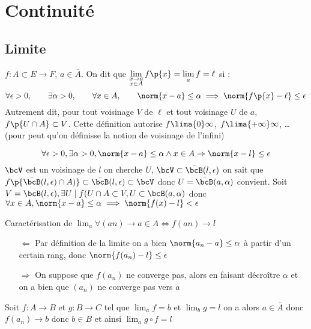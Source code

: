 \documentclass[a4paper,french,bookmarks]{book}
\begin{document}
    \section{Continuité}
    
    \subsection{Limite}
    
    $f : A \subset E \to F$, $a \in \overline{A}$. On dit que $\lim\limits_{\substack{x \to a\\ x \in A}} f\p{x} = \lim\limits_a f = \ell$ si :
    \[ \forall \epsilon > 0,\qquad \exists \alpha > 0,\qquad \forall x \in A,\qquad \norm{x - a} \leq \alpha \implies \norm{f\p{x} - \ell} \leq \epsilon\]
    Autrement dit, pour tout voisinage $V$ de $\ell$ et tout voisinage $U$ de $a$, $f\p{U \cap A} \subset V$.
    Cette définition autorise $f \lima{0} \infty$, $f \lima{+\infty} \infty$, \dots (pour peut qu'on définisse la notion de voisinage de l'infini)
    
    \[\forall \epsilon > 0, \exists \alpha > 0, \norm{x-a} \leq \alpha \land x \in A \Rightarrow \norm{x-l} \leq \epsilon\]
    \(\bcV\) est un voisinage de $l$ on cherche $U$, \(\bcV \subset \bar{\bcB}(l,\epsilon)\) on sait que \(f\p{\bar{\bcB}(l,\epsilon)\cap A)} \subset \bar{\bcB}(l,\epsilon) \subset \bcV\) donc \(U = \bar{\bcB}(a,\alpha)\) convient.
    Soit $V= \bcB(l,\epsilon), \exists U \mid f(U \cap A \subset V, U \subset \bcB(a,\alpha)$ donc $\forall x \in A , \norm{x-a} \leq \alpha\implies  \norm{f(x) -l} < \epsilon$

    Caractérisation de \(\lim_a\forall (an) \to a \in A \Leftrightarrow f(an) \to l\)

    \begin{enumerate}
        \item[\(\Leftarrow\)] Par définition de la limite on a bien \( \norm{a_n-a} \leq \alpha\) à partir d'un certain rang, donc \(\norm{f(a_n) -l} \leq \epsilon\)
        \item[\(\Rightarrow\)] On suppose que \(f(a_n)\) ne converge pas, alors en faisant décroître \(\alpha\) et on a bien que \((a_n)\) ne converge pas vers \(a\)
    \end{enumerate}

    \begin{example}{}{}
        Soit $f:A\to B$ et $g : B \to C$ tel que $\lim_a f = b$ et $\lim_b g= l$ on a alors \(a\in\bar{A}\) donc \(f(a_n) \to b\) donc $b\in B$ et ainsi $\lim_a g \circ f = l$
        
    \end{example}
    
\end{document}
